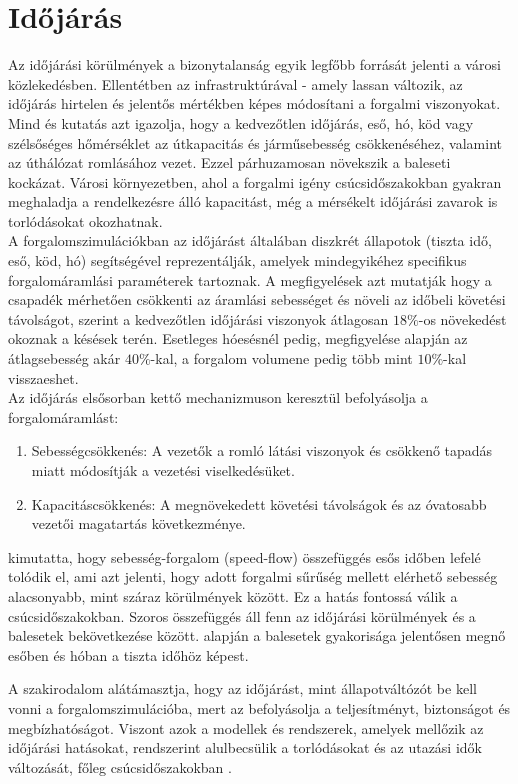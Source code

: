 \documentclass[14pt,a4paper]{extarticle}
\begin{document}
\section{Időjárás}
Az időjárási körülmények a bizonytalanság egyik legfőbb forrását jelenti a városi közlekedésben. Ellentétben az infrastruktúrával - amely lassan változik, az időjárás hirtelen és jelentős mértékben képes módosítani a forgalmi viszonyokat. Mind \cite{ref4} és \cite{ref6} kutatás azt igazolja, hogy a kedvezőtlen időjárás, eső, hó, köd vagy szélsőséges hőmérséklet az útkapacitás és járműsebesség csökkenéséhez, valamint az úthálózat romlásához vezet. Ezzel párhuzamosan növekszik a baleseti kockázat.
Városi környezetben, ahol a forgalmi igény csúcsidőszakokban gyakran meghaladja a rendelkezésre álló kapacitást, még a mérsékelt időjárási zavarok is torlódásokat okozhatnak.
\\
A forgalomszimulációkban az időjárást általában diszkrét állapotok (tiszta idő, eső, köd, hó) segítségével reprezentálják, amelyek mindegyikéhez specifikus forgalomáramlási paraméterek tartoznak. A megfigyelések azt mutatják hogy a csapadék mérhetően csökkenti az áramlási sebességet és növeli az időbeli követési távolságot, \cite{ref4} szerint a kedvezőtlen időjárási viszonyok átlagosan $18\%$-os növekedést okoznak a késések terén. Esetleges hóesésnél pedig, \cite{ref6} megfigyelése alapján az átlagsebesség akár $40\%$-kal, a forgalom volumene pedig több mint $10\%$-kal visszaeshet.
\\
Az időjárás elsősorban kettő mechanizmuson keresztül befolyásolja a forgalomáramlást:
\begin{enumerate}
	\item Sebességcsökkenés: A vezetők a romló látási viszonyok és csökkenő tapadás miatt módosítják a vezetési viselkedésüket.
	\item Kapacitáscsökkenés: A megnövekedett követési távolságok és az óvatosabb vezetői magatartás következménye. 
\end{enumerate}
\cite{ref6} kimutatta, hogy sebesség-forgalom (speed-flow) összefüggés esős időben lefelé tolódik el, ami azt jelenti, hogy adott forgalmi sűrűség mellett elérhető sebesség alacsonyabb, mint száraz körülmények között. Ez a hatás fontossá válik a csúcsidőszakokban.
Szoros összefüggés áll fenn az időjárási körülmények és a balesetek bekövetkezése között. \cite{ref7} alapján a balesetek gyakorisága jelentősen megnő esőben és hóban a tiszta időhöz képest.

A szakirodalom alátámasztja, hogy az időjárást, mint állapotváltózót be kell vonni a forgalomszimulációba, mert az befolyásolja a teljesítményt, biztonságot és megbízhatóságot.
Viszont azok a modellek és rendszerek, amelyek mellőzik az időjárási hatásokat, rendszerint alulbecsülik a torlódásokat és az utazási idők változását, főleg csúcsidőszakokban \cite{ref6}.
\end{document}
